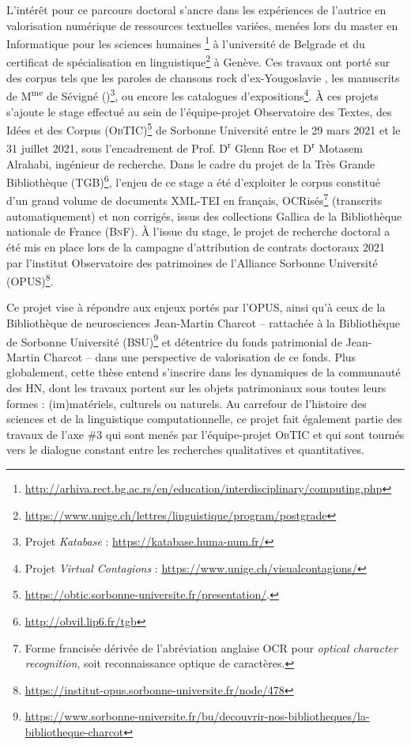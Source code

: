 L’intérêt pour ce parcours doctoral s'ancre dans les expériences de l'autrice en valorisation numérique de ressources textuelles variées, menées lors du master en \og Informatique pour les sciences humaines \fg{}\footnote{\url{http://arhiva.rect.bg.ac.rs/en/education/interdisciplinary/computing.php}} à l'université de Belgrade et du certificat de spécialisation en linguistique\footnote{\url{https://www.unige.ch/lettres/linguistique/program/postgrade}} à Genève. Ces travaux ont porté sur des corpus tels que les paroles de chansons rock d’ex-Yougoslavie \citep{petkovic2019creation}, les manuscrits de M\textsuperscript{me} de Sévigné (\citealp{gabay2020quantifying,gabay2021katabase})\footnote{Projet \textit{Katabase} : \url{https://katabase.huma-num.fr/}}, ou encore les catalogues d’expositions\footnote{Projet \textit{Virtual Contagions} : \url{https://www.unige.ch/visualcontagions/}}.
À ces projets s'ajoute le stage effectué au sein de l'équipe-projet Observatoire des Textes, des Idées et des Corpus (\textsc{ObTIC})\footnote{\url{https://obtic.sorbonne-universite.fr/presentation/}.} de Sorbonne Université entre le 29 mars 2021 et le 31 juillet 2021, sous l'encadrement de Prof. D\textsuperscript{r} Glenn Roe et D\textsuperscript{r} Motasem Alrahabi, ingénieur de recherche. Dans le cadre du projet de la Très Grande Bibliothèque (\textsc{TGB})\footnote{\url{http://obvil.lip6.fr/tgb}}, l'enjeu de ce stage a été d'exploiter le corpus constitué d'un grand volume de documents \textsc{XML-TEI} en français, OCRisés\footnote{Forme francisée dérivée de l'abréviation anglaise \textsc{OCR} pour \textit{optical character recognition}, soit \og{}reconnaissance optique de caractères\fg{}.} (transcrits automatiquement) et non corrigés, issus des collections Gallica de la Bibliothèque nationale de France (\textsc{BnF}). 
À l'issue du stage, le projet de recherche doctoral a été mis en place lors de la campagne d'attribution de contrats doctoraux 2021 par l'institut Observatoire des patrimoines de l'Alliance Sorbonne Université (\textsc{OPUS})\footnote{\url{https://institut-opus.sorbonne-universite.fr/node/478}}. 

Ce projet vise à répondre aux enjeux portés par l'\textsc{OPUS}, ainsi qu'à ceux de la Bibliothèque de neurosciences Jean-Martin Charcot -- rattachée à la Bibliothèque de Sorbonne Université (\textsc{BSU})\footnote{\url{https://www.sorbonne-universite.fr/bu/decouvrir-nos-bibliotheques/la-bibliotheque-charcot}} et détentrice du fonds patrimonial de Jean-Martin Charcot -- dans une perspective de valorisation de ce fonds. Plus globalement, cette thèse entend s'inscrire dans les dynamiques de la communauté des \textsc{HN}, dont les travaux portent sur les objets patrimoniaux sous toutes leurs formes : (im)matériels, culturels ou naturels. Au carrefour de l'histoire des sciences et de la linguistique computationnelle, ce projet fait également partie des travaux de l'axe \#3 qui sont menés par l'équipe-projet \textsc{ObTIC} et qui sont tournés vers le dialogue constant entre les recherches qualitatives et quantitatives. 

